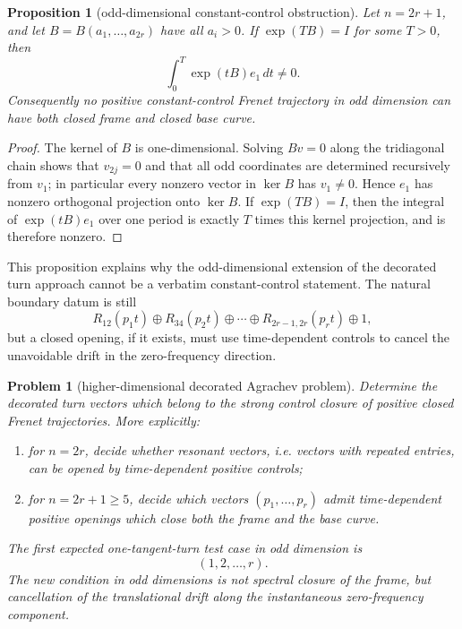 \documentclass[11pt,reqno]{amsart}
\newtheorem{proposition}[theorem]{Proposition}
\newtheorem{problem}[theorem]{Problem}
\theoremstyle{definition}
\theoremstyle{remark}
\begin{document}
\begin{proposition}[odd-dimensional constant-control obstruction]
\label{prop:odd-constant-obstruction}
Let $n=2r+1$, and let $B=B(a_1,\ldots,a_{2r})$ have all $a_i>0$.  If
$\exp(TB)=I$ for some $T>0$, then
\[
        \int_0^T\exp(tB)e_1\,dt\ne0.
\]
Consequently no positive constant-control Frenet trajectory in odd dimension can
have both closed frame and closed base curve.
\end{proposition}

\begin{proof}
The kernel of $B$ is one-dimensional.  Solving $Bv=0$ along the tridiagonal chain
shows that $v_{2j}=0$ and that all odd coordinates are determined recursively from
$v_1$; in particular every nonzero vector in $\ker B$ has $v_1\ne0$.  Hence $e_1$
has nonzero orthogonal projection onto $\ker B$.  If $\exp(TB)=I$, then the integral
of $\exp(tB)e_1$ over one period is exactly $T$ times this kernel projection, and
is therefore nonzero.
\end{proof}

This proposition explains why the odd-dimensional extension of the decorated turn
approach cannot be a verbatim constant-control statement.  The natural boundary datum
is still
\[
        R_{12}(p_1t)\oplus R_{34}(p_2t)\oplus\cdots\oplus
        R_{2r-1,2r}(p_rt)\oplus 1,
\]
but a closed opening, if it exists, must use time-dependent controls to cancel the
unavoidable drift in the zero-frequency direction.

\begin{problem}[higher-dimensional decorated Agrachev problem]
\label{prob:higher-decorated}
Determine the decorated turn vectors which belong to the strong control closure of
positive closed Frenet trajectories.  More explicitly:
\begin{enumerate}[label=\textup{(\alph*)}]
\item for $n=2r$, decide whether resonant vectors, i.e. vectors with repeated
entries, can be opened by time-dependent positive controls;
\item for $n=2r+1\ge5$, decide which vectors
$(p_1,\ldots,p_r)$ admit time-dependent positive openings which close both the
frame and the base curve.
\end{enumerate}
The first expected one-tangent-turn test case in odd dimension is
\[
        (1,2,\ldots,r).
\]
The new condition in odd dimensions is not spectral closure of the frame, but
cancellation of the translational drift along the instantaneous zero-frequency
component.
\end{problem}
\end{document}
